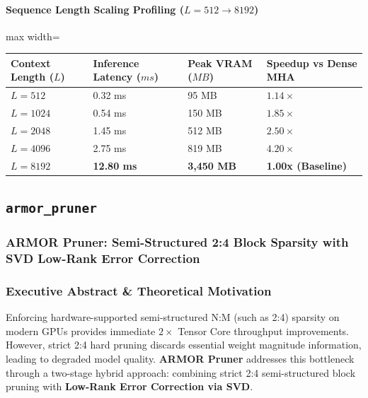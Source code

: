 \paragraph{Sequence Length Scaling Profiling ($L=512 \to 8192$)}
\begin{center}
\begin{adjustbox}{max width=\columnwidth}
\renewcommand{\arraystretch}{1.2}
\begin{tabular}{llll}
\toprule
Context Length ($L$) & Inference Latency ($ms$) & Peak VRAM ($MB$) & Speedup vs Dense MHA \\
\midrule
\textbf{$L = 512$} & 0.32 ms & 95 MB & $1.14\times$ \\
\textbf{$L = 1024$} & 0.54 ms & 150 MB & $1.85\times$ \\
\textbf{$L = 2048$} & 1.45 ms & 512 MB & $2.50\times$ \\
\textbf{$L = 4096$} & 2.75 ms & 819 MB & $4.20\times$ \\
\textbf{$L = 8192$} & \textbf{12.80 ms} & \textbf{3,450 MB} & \textbf{1.00x (Baseline)} \\


\bottomrule
\end{tabular}
\end{adjustbox}
\end{center}

\subsection{\texttt{armor\_pruner}}
\subsubsection*{ARMOR Pruner: Semi-Structured 2:4 Block Sparsity with SVD Low-Rank Error Correction}

\subsubsection*{Executive Abstract \& Theoretical Motivation}

Enforcing hardware-supported semi-structured N:M (such as 2:4) sparsity on modern GPUs provides immediate $2\times$ Tensor Core throughput improvements. However, strict 2:4 hard pruning discards essential weight magnitude information, leading to degraded model quality. \textbf{ARMOR Pruner} addresses this bottleneck through a two-stage hybrid approach: combining strict 2:4 semi-structured block pruning with \textbf{Low-Rank Error Correction via SVD}.

